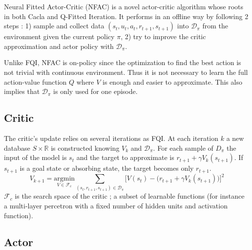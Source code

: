 Neural Fitted Actor-Critic (NFAC) is a novel actor-critic algorithm whose roots in both Cacla and Q-Fitted Iteration.
It performs in an offline way by following 2 steps : 1) sample and collect data $(s_t, u_t, a_t, r_{t+1}, s_{t+1})$ into $\mathcal{D}_\pi$
from the environment given the current policy $\pi$, 2) try to improve the critic approximation and actor policy with $\mathcal{D}_\pi$.


Unlike FQI, NFAC is on-policy since the optimization to find the best action is not trivial 
with continuous environment. Thus it is not necessary to learn the full action-value function $Q$
where $V$ is enough and easier to approximate. This also implies that $\mathcal{D}_\pi$ is only
used for one episode.

\subsection{Critic}

The critic's update relies on several iterations as FQI. 
At each iteration $k$ a new database $S \times \mathbb{R}$ is constructed knowing $V_k$ and $\mathcal{D}_\pi$.
For each sample of $D_\pi$ the input of the model is $s_t$ and the target to approximate is $r_{t+1} + \gamma V_k(s_{t+1})$.
If $s_{t+1}$ is a goal state or absorbing state, the target becomes only $r_{t+1}$.
\begin{equation}
 V_{k+1} = \underset{V \in \mathcal{F}_c}{\text{argmin}} 
 \sum_{ (s_t, r_{t+1}, s_{t+1}) \in \mathcal{D}_\pi}
 \Big[ V(s_t) - \big( r_{t+1} + \gamma V_k(s_{t+1}) \big) \Big]^2
\end{equation}
$\mathcal{F}_c$ is the search space of the critic ; a subset of learnable functions
(for instance a multi-layer percetron with a fixed number of hidden units and activation function).

\subsection{Actor}

